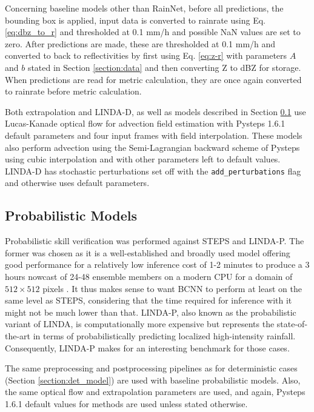 Concerning baseline models other than RainNet, before all predictions, the bounding box is applied, input data is converted to rainrate using Eq. \eqref{eq:dbz_to_r} and thresholded at 0.1 mm/h and possible NaN values are set to zero. After predictions are made, these are thresholded at 0.1 mm/h and converted to back to reflectivities by first using Eq. \eqref{eq:z-r} with parameters $A$ and $b$ stated in Section \ref{section:data} and then converting Z to dBZ for storage. When predictions are read for metric calculation, they are once again converted to rainrate before metric calculation.

Both extrapolation and LINDA-D, as well as models described in Section \ref{section:prob_model} use Lucas-Kanade optical flow for advection field estimation with Pysteps \cite{pulkkinen_pysteps_2019} 1.6.1 default parameters and four input frames with field interpolation. These models also perform advection using the Semi-Lagrangian backward scheme of Pysteps using cubic interpolation and with other parameters left to default values. LINDA-D has stochastic perturbations set off with the \texttt{add\_perturbations} flag and otherwise uses default parameters. 


\subsection{Probabilistic Models}
\label{section:prob_model}

Probabilistic skill verification was performed against STEPS and LINDA-P. The former was chosen as it is a well-established and broadly used model offering good performance for a relatively low inference cost of 1-2 minutes to produce a 3 hours nowcast of 24-48 ensemble members on a modern CPU for a domain of $512 \times 512$ pixels \cite{pulkkinen_pysteps_2019}. It thus makes sense to want BCNN to perform at least on the same level as STEPS, considering that the time required for inference with it might not be much lower than that. LINDA-P, also known as the probabilistic variant of LINDA, is computationally more expensive but represents the state-of-the-art in terms of probabilistically predicting localized high-intensity rainfall. Consequently, LINDA-P makes for an interesting benchmark for those cases. 

The same preprocessing and postprocessing pipelines as for deterministic cases (Section \ref{section:det_model}) are used with baseline probabilistic models. Also, the same optical flow and extrapolation parameters are used, and again, Pysteps 1.6.1 default values for methods are used unless stated otherwise. 

